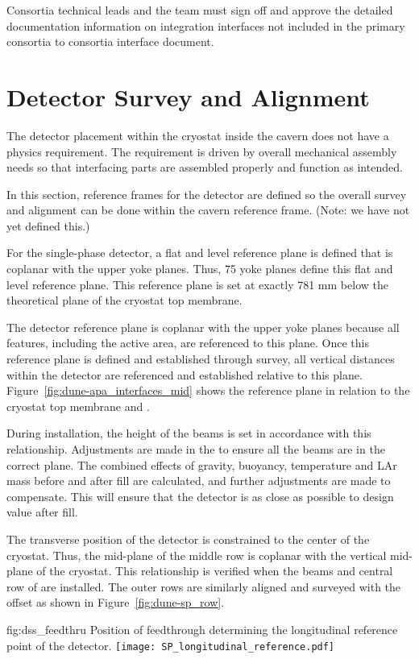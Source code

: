 Consortia technical leads and the  team must sign off
and approve the detailed documentation information on integration
interfaces not included in the primary consortia to consortia
interface document.




\section{Detector Survey and Alignment}
\label{sec:fdsp-coord-integ-survey}
The detector placement within the cryostat inside the
cavern does not have a physics requirement. The requirement is driven
by overall mechanical assembly needs so that interfacing
parts are assembled properly and function as intended.


In this section, reference frames for the detector are defined so the overall survey and alignment can be done within
the cavern reference frame. (Note: we have not yet defined this.)


For the single-phase detector, a flat and level reference  plane is
defined that is coplanar with the upper  yoke
planes. Thus, 75 yoke planes define this flat and
level reference  plane. This reference plane is set at exactly 781 mm below the
theoretical plane of the cryostat top membrane.


The detector reference plane is coplanar with the upper
 yoke planes because all features, including
the active area, are referenced  to this plane.  Once this reference
plane is defined and established through survey, all vertical
distances within the detector are referenced 
and established relative to this
plane.  Figure~\ref{fig:dune-apa_interfaces_mid} shows the reference
plane in relation to the cryostat top membrane and .


During installation, the height of the  beams
is set in accordance with this relationship. Adjustments are made in the
 to ensure all the beams are in the
correct plane. The combined effects of gravity, buoyancy, temperature and LAr mass
before and after fill are calculated, and further adjustments are made
to compensate. This will ensure that the detector is as close as
possible to design value after fill.


The transverse position of the detector is constrained to the center
of the cryostat. Thus, the mid-plane of the middle row  is
coplanar with the vertical mid-plane of the cryostat. This
relationship is verified when the  beams and central row of
 are installed. The outer rows are similarly aligned and
surveyed with the offset as shown in Figure~\ref{fig:dune-sp_row}.
\begin{dunefigure}{fig:dss_feedthru}
  {Position of feedthrough determining the longitudinal reference point of the detector.}
  \texttt{[image: SP\_longitudinal\_reference.pdf]}
\end{dunefigure}


